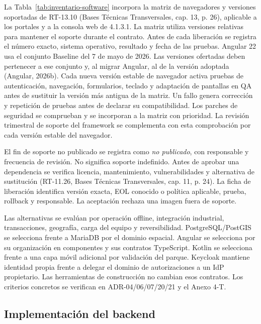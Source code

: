 La Tabla~\ref{tab:inventario-software} incorpora la matriz de navegadores y versiones soportadas de RT-13.10 (Bases Técnicas Transversales, cap. 13, p. 26), aplicable a los portales y a la consola web de 4.1.3.1. La matriz utiliza versiones relativas para mantener el soporte durante el contrato. Antes de cada liberación se registra el número exacto, sistema operativo, resultado y fecha de las pruebas. Angular 22 usa el conjunto Baseline del 7 de mayo de 2026. Las versiones ofertadas deben pertenecer a ese conjunto y, al migrar Angular, al de la versión adoptada (Angular, 2026b). Cada nueva versión estable de navegador activa pruebas de autenticación, navegación, formularios, teclado y adaptación de pantallas en QA antes de sustituir la versión más antigua de la matriz. Un fallo genera corrección y repetición de pruebas antes de declarar su compatibilidad. Los parches de seguridad se comprueban y se incorporan a la matriz con prioridad. La revisión trimestral de soporte del framework se complementa con esta comprobación por cada versión estable del navegador.

El fin de soporte no publicado se registra como \emph{no publicado}, con responsable y frecuencia de revisión. No significa soporte indefinido. Antes de aprobar una dependencia se verifica licencia, mantenimiento, vulnerabilidades y alternativa de sustitución (RT-11.26, Bases Técnicas Transversales, cap. 11, p. 24). La ficha de liberación identifica versión exacta, EOL conocido o política aplicable, prueba, rollback y responsable. La aceptación rechaza una imagen fuera de soporte.

Las alternativas se evalúan por operación offline, integración industrial, transacciones, geografía, carga del equipo y reversibilidad. PostgreSQL/PostGIS se selecciona frente a MariaDB por el dominio espacial. Angular se selecciona por su organización en componentes y sus contratos TypeScript. Kotlin se selecciona frente a una capa móvil adicional por validación del parque. Keycloak mantiene identidad propia frente a delegar el dominio de autorizaciones a un IdP propietario. Las herramientas de construcción no cambian esos contratos. Los criterios concretos se verifican en ADR-04/06/07/20/21 y el Anexo 4-T.
\subsection*{Implementación del backend}

